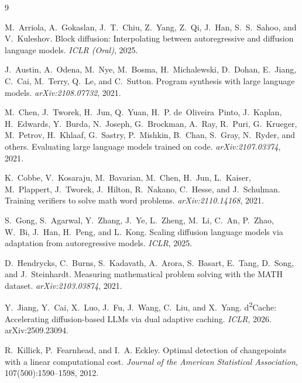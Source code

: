 \documentclass[11pt]{article}
\begin{document}

\small
\begin{thebibliography}{9}
\setlength{\itemsep}{0.05em}

M.~Arriola, A.~Gokaslan, J.~T.~Chiu, Z.~Yang, Z.~Qi, J.~Han, S.~S.~Sahoo, and V.~Kuleshov.
\newblock Block diffusion: Interpolating between autoregressive and diffusion language models.
\newblock \emph{ICLR (Oral)}, 2025.

J.~Austin, A.~Odena, M.~Nye, M.~Bosma, H.~Michalewski, D.~Dohan, E.~Jiang, C.~Cai, M.~Terry, Q.~Le, and C.~Sutton.
\newblock Program synthesis with large language models.
\newblock \emph{arXiv:2108.07732}, 2021.

M.~Chen, J.~Tworek, H.~Jun, Q.~Yuan, H.~P. de~Oliveira~Pinto, J.~Kaplan, H.~Edwards, Y.~Burda, N.~Joseph, G.~Brockman, A.~Ray, R.~Puri, G.~Krueger, M.~Petrov, H.~Khlaaf, G.~Sastry, P.~Mishkin, B.~Chan, S.~Gray, N.~Ryder, and others.
\newblock Evaluating large language models trained on code.
\newblock \emph{arXiv:2107.03374}, 2021.

K.~Cobbe, V.~Kosaraju, M.~Bavarian, M.~Chen, H.~Jun, L.~Kaiser, M.~Plappert, J.~Tworek, J.~Hilton, R.~Nakano, C.~Hesse, and J.~Schulman.
\newblock Training verifiers to solve math word problems.
\newblock \emph{arXiv:2110.14168}, 2021.

S.~Gong, S.~Agarwal, Y.~Zhang, J.~Ye, L.~Zheng, M.~Li, C.~An, P.~Zhao, W.~Bi, J.~Han, H.~Peng, and L.~Kong.
\newblock Scaling diffusion language models via adaptation from autoregressive models.
\newblock \emph{ICLR}, 2025.

D.~Hendrycks, C.~Burns, S.~Kadavath, A.~Arora, S.~Basart, E.~Tang, D.~Song, and J.~Steinhardt.
\newblock Measuring mathematical problem solving with the MATH dataset.
\newblock \emph{arXiv:2103.03874}, 2021.

Y.~Jiang, Y.~Cai, X.~Luo, J.~Fu, J.~Wang, C.~Liu, and X.~Yang.
\newblock d\textsuperscript{2}Cache: Accelerating diffusion-based LLMs via dual adaptive caching.
\newblock \emph{ICLR}, 2026. arXiv:2509.23094.

R.~Killick, P.~Fearnhead, and I.~A. Eckley.
\newblock Optimal detection of changepoints with a linear computational cost.
\newblock \emph{Journal of the American Statistical Association}, 107(500):1590--1598, 2012.


\end{thebibliography}
\end{document}

